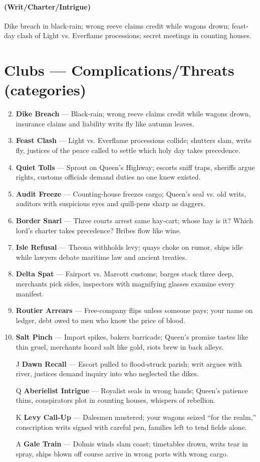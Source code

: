 \paragraph*{(Writ/Charter/Intrigue)} Dike breach in black-rain; wrong reeve claims credit while wagons drown; feast-day clash of Light vs. Everflame processions; secret meetings in counting houses.

\section*{Clubs --- Complications/Threats (categories)}
\label{sec:viterra-complications}
\begin{enumerate}
\setcounter{enumi}{1}
\item \textbf{Dike Breach} --- Black-rain; wrong reeve claims credit while wagons drown, insurance claims and liability writs fly like autumn leaves.
\item \textbf{Feast Clash} --- Light vs. Everflame processions collide; shutters slam, writs fly, justices of the peace called to settle which holy day takes precedence.
\item \textbf{Quiet Tolls} --- Sprout on Queen's Highway; escorts sniff traps, sheriffs argue rights, customs officials demand duties no one knew existed.
\item \textbf{Audit Freeze} --- Counting-house freezes cargo; Queen's seal vs. old writs, auditors with suspicious eyes and quill-pens sharp as daggers.
\item \textbf{Border Snarl} --- Three courts arrest same hay-cart; whose hay is it? Which lord's charter takes precedence? Bribes flow like wine.
\item \textbf{Isle Refusal} --- Theona withholds levy; quays choke on rumor, ships idle while lawyers debate maritime law and ancient treaties.
\item \textbf{Delta Spat} --- Fairport vs. Marcott customs; barges stack three deep, merchants pick sides, inspectors with magnifying glasses examine every manifest.
\item \textbf{Routier Arrears} --- Free-company flips unless someone pays; your name on ledger, debt owed to men who know the price of blood.
\item \textbf{Salt Pinch} --- Import spikes, bakers barricade; Queen's promise tastes like thin gruel, merchants hoard salt like gold, riots brew in back alleys.
\item[J] \textbf{Dawn Recall} --- Escort pulled to flood-struck parish; writ argues with river, justices demand inquiry into who neglected the dikes.
\item[Q] \textbf{Aberielist Intrigue} --- Royalist seals in wrong hands; Queen's patience thins, conspirators plot in counting houses, whispers of rebellion.
\item[K] \textbf{Levy Call-Up} --- Dalesmen mustered; your wagons seized ``for the realm,'' conscription writs signed with careful pen, families left to tend fields alone.
\item[A] \textbf{Gale Train} --- Dolmis winds slam coast; timetables drown, writs tear in spray, ships blown off course arrive in wrong ports with wrong cargo.
\end{enumerate}

